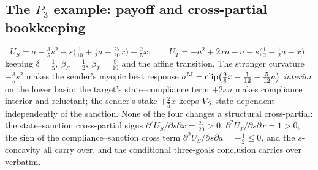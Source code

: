 \subsection[The P3 example: payoff and cross-partial bookkeeping]
{The $P_3$ example: payoff and cross-partial bookkeeping}

\[
  U_S=a-\tfrac35 s^2-s\big(\tfrac1{10}+\tfrac12 a-\tfrac{27}{20}x\big)+\tfrac25 x,
  \qquad
  U_T=-a^2+2xa-a-s\big(\tfrac12-\tfrac12 a-x\big),
\]
keeping $\delta=\tfrac15,\ \beta_S=\tfrac12,\ \beta_T=\tfrac9{10}$ and the affine
transition. The stronger curvature $-\tfrac35 s^2$ makes the sender's myopic best response
$\sigma^{\mathrm{M}}=\mathrm{clip}\big(\tfrac98 x-\tfrac1{12}-\tfrac5{12}a\big)$ \emph{interior}
on the lower basin; the target's state--compliance term $+2xa$ makes compliance interior and
reluctant; the sender's stake $+\tfrac25 x$ keeps $V_S$ state-dependent independently of the
sanction. None of the four changes a structural cross-partial: the
state--sanction cross-partial signs $\partial^2U_S/\partial s\partial x=\tfrac{27}{20}>0$,
$\partial^2U_T/\partial s\partial x=1>0$, the sign of the compliance--sanction cross term
$\partial^2U_S/\partial s\partial a=-\tfrac12\le0$, and the $s$-concavity all
carry over, and the conditional three-goals
conclusion carries over verbatim.


